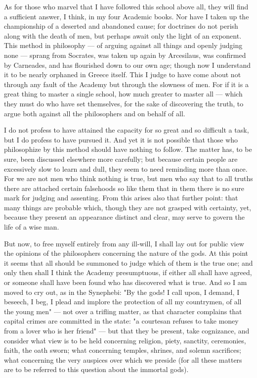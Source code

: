  As for those who marvel that I have followed this school above all, they will find a sufficient answer, I think, in my four Academic books. Nor have I taken up the championship of a deserted and abandoned cause; for doctrines do not perish along with the death of men, but perhaps await only the light of an exponent. This method in philosophy — of arguing against all things and openly judging none — sprang from Socrates, was taken up again by Arcesilaus, was confirmed by Carneades, and has flourished down to our own age; though now I understand it to be nearly orphaned in Greece itself. This I judge to have come about not through any fault of the Academy but through the slowness of men. For if it is a great thing to master a single school, how much greater to master all — which they must do who have set themselves, for the sake of discovering the truth, to argue both against all the philosophers and on behalf of all.

 I do not profess to have attained the capacity for so great and so difficult a task, but I do profess to have pursued it. And yet it is not possible that those who philosophize by this method should have nothing to follow. The matter has, to be sure, been discussed elsewhere more carefully; but because certain people are excessively slow to learn and dull, they seem to need reminding more than once. For we are not men who think nothing is true, but men who say that to all truths there are attached certain falsehoods so like them that in them there is no sure mark for judging and assenting. From this arises also that further point: that many things are probable which, though they are not grasped with certainty, yet, because they present an appearance distinct and clear, may serve to govern the life of a wise man.

 But now, to free myself entirely from any ill-will, I shall lay out for public view the opinions of the philosophers concerning the nature of the gods. At this point it seems that all should be summoned to judge which of them is the true one; and only then shall I think the Academy presumptuous, if either all shall have agreed, or someone shall have been found who has discovered what is true. And so I am moved to cry out, as in the Synephebi: "By the gods! I call upon, I demand, I beseech, I beg, I plead and implore the protection of all my countrymen, of all the young men" — not over a trifling matter, as that character complains that capital crimes are committed in the state: "a courtesan refuses to take money from a lover who is her friend" — but that they be present, take cognizance, and consider what view is to be held concerning religion, piety, sanctity, ceremonies, faith, the oath sworn; what concerning temples, shrines, and solemn sacrifices; what concerning the very auspices over which we preside (for all these matters are to be referred to this question about the immortal gods).


